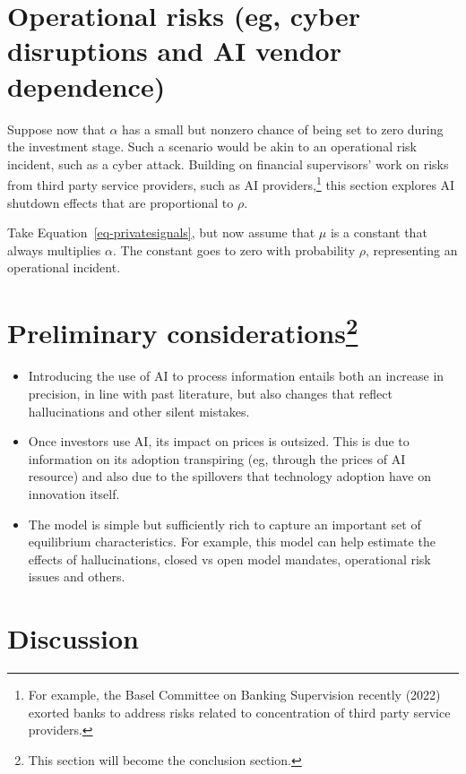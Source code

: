 \documentclass[
]{article}
\theoremstyle{plain}
\theoremstyle{remark}
\begin{document}
\section{Operational risks (eg, cyber disruptions and AI vendor
dependence)}\label{operational-risks-eg-cyber-disruptions-and-ai-vendor-dependence}

Suppose now that \(\alpha\) has a small but nonzero chance of being set
to zero during the investment stage. Such a scenario would be akin to an
operational risk incident, such as a cyber attack. Building on financial
supervisors' work on risks from third party service providers, such as
AI providers,\footnote{For example, the Basel Committee on Banking
  Supervision recently (2022) exorted banks to address risks related to
  concentration of third party service providers.} this section explores
AI shutdown effects that are proportional to \(\rho\).

Take Equation~\ref{eq-privatesignals}, but now assume that \(\mu\) is a
constant that always multiplies \(\alpha\). The constant goes to zero
with probability \(\rho\), representing an operational incident.

\section[Preliminary considerations]{\texorpdfstring{Preliminary
considerations\footnote{This section will become the conclusion section.}}{Preliminary considerations}}\label{preliminary-considerationsconcl}

\begin{itemize}
\item
  Introducing the use of AI to process information entails both an
  increase in precision, in line with past literature, but also changes
  that reflect hallucinations and other silent mistakes.
\item
  Once investors use AI, its impact on prices is outsized. This is due
  to information on its adoption transpiring (eg, through the prices of
  AI resource) and also due to the spillovers that technology adoption
  have on innovation itself.
\item
  The model is simple but sufficiently rich to capture an important set
  of equilibrium characteristics. For example, this model can help
  estimate the effects of hallucinations, closed vs open model mandates,
  operational risk issues and others.
\end{itemize}

\section{Discussion}\label{discussion}
\end{document}
